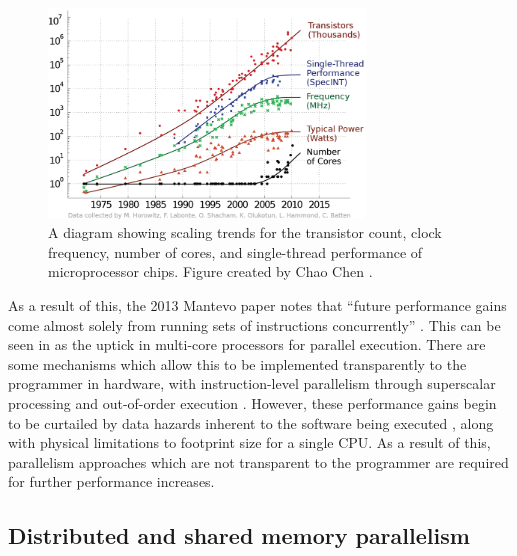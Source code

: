 \begin{figure}[H]
    \centering
    \includegraphics[width=0.75\textwidth]{images/2_background/1-Trends-in-transistor-count-performance-core-count-and-power-over-the-past-decades.png}
    \caption{A diagram showing scaling trends for the transistor count, clock frequency, number of cores, and single-thread performance of microprocessor chips. Figure created by Chao Chen \cite{chenEnergyefficientElectricalSiliconphotonic2014}.}
    \label{fig:scaling-trends-transistor-clock}
\end{figure}

As a result of this, the 2013 Mantevo paper notes that ``future performance gains come almost solely from running sets of instructions concurrently'' \cite{heroux2013mantevo}. This can be seen in \label{fig:scaling-trends-transistor-clock} as the uptick in multi-core processors for parallel execution. There are some mechanisms which allow this to be implemented transparently to the programmer in hardware, with instruction-level parallelism through superscalar processing and out-of-order execution \cite{pattersonHennessyComputerOrganisationArchitecture}. However, these performance gains begin to be curtailed by data hazards inherent to the software being executed \cite{shahhoseini1999achieving}, along with physical limitations to footprint size for a single CPU. As a result of this, parallelism approaches which are not transparent to the programmer are required for further performance increases.

\subsection{Distributed and shared memory parallelism}
\label{ssec:distributed-shared-memory-paralellism} %


